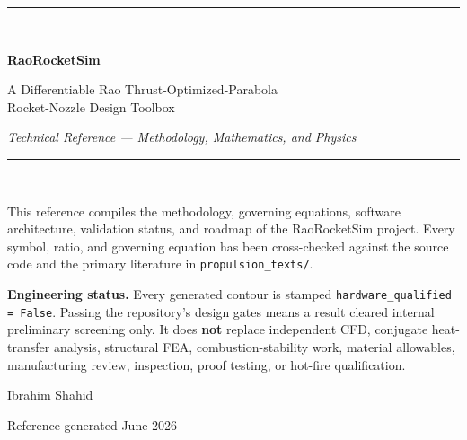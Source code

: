 \documentclass[11pt]{article}
\newcommand{\code}[1]{\texttt{#1}}
\begin{document}
\begin{titlepage}
\centering
\vspace*{2.2cm}
{\color{rulegray}\rule{\textwidth}{0.8pt}}\\[1.0cm]
{\Huge\bfseries\color{accentdark} RaoRocketSim\par}
\vspace{0.5cm}
{\Large A Differentiable Rao Thrust-Optimized-Parabola\\[2pt]
Rocket-Nozzle Design Toolbox\par}
\vspace{0.5cm}
{\large\itshape Technical Reference --- Methodology, Mathematics, and Physics\par}
\vspace{0.8cm}
{\color{rulegray}\rule{\textwidth}{0.8pt}}\\[1.4cm]

\begin{minipage}{0.85\textwidth}\centering\small
This reference compiles the methodology, governing equations, software
architecture, validation status, and roadmap of the RaoRocketSim project.
Every symbol, ratio, and governing equation has been cross-checked against
the source code and the primary literature in \code{propulsion\_texts/}.
\end{minipage}

\vfill
\begin{statusbox}
\centering\small
\textbf{Engineering status.} Every generated contour is stamped
\code{hardware\_qualified = False}. Passing the repository's design gates
means a result cleared internal preliminary screening only. It does
\textbf{not} replace independent CFD, conjugate heat-transfer analysis,
structural FEA, combustion-stability work, material allowables,
manufacturing review, inspection, proof testing, or hot-fire qualification.
\end{statusbox}
\vspace{0.8cm}

{\large Ibrahim Shahid\par}
\vspace{0.2cm}
{\color{accentdark} Reference generated June 2026}\par
\end{titlepage}

\tableofcontents
\thispagestyle{fancy}
\clearpage

\end{document}
